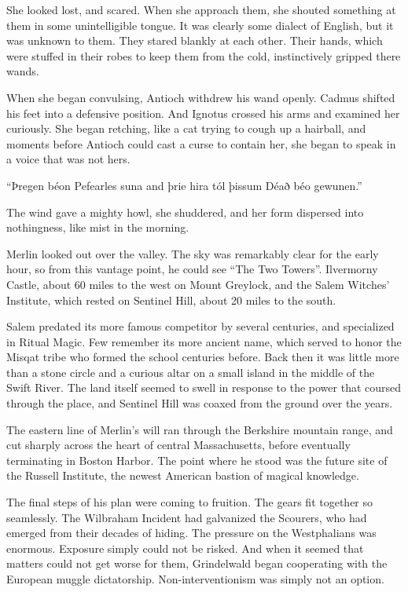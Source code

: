 She looked lost, and scared. When she approach them, she shouted something at them in some unintelligible tongue. It was clearly some dialect of English, but it was unknown to them. They stared blankly at each other. Their hands, which were stuffed in their robes to keep them from the cold, instinctively gripped there wands.

When she began convulsing, Antioch withdrew his wand openly. Cadmus shifted his feet into a defensive position. And Ignotus crossed his arms and examined her curiously. She began retching, like a cat trying to cough up a hairball, and moments before Antioch could cast a curse to contain her, she began to speak in a voice that was not hers.

“Þregen béon Pefearles suna and þrie hira tól þissum Déað béo gewunen.”

The wind gave a mighty howl, she shuddered, and her form dispersed into nothingness, like mist in the morning.

\simpleline


Merlin looked out over the valley. The sky was remarkably clear for the early hour, so from this vantage point, he could see “The Two Towers”. Ilvermorny Castle, about 60 miles to the west on Mount Greylock, and the Salem Witches’ Institute, which rested on Sentinel Hill, about 20 miles to the south.

Salem predated its more famous competitor by several centuries, and specialized in Ritual Magic. Few remember its more ancient name, which served to honor the Misqat tribe who formed the school centuries before. Back then it was little more than a stone circle and a curious altar on a small island in the middle of the Swift River. The land itself seemed to swell in response to the power that coursed through the place, and Sentinel Hill was coaxed from the ground over the years.

The eastern line of Merlin’s will ran through the Berkshire mountain range, and cut sharply across the heart of central Massachusetts, before eventually terminating in Boston Harbor. The point where he stood was the future site of the Russell Institute, the newest American bastion of magical knowledge.

The final steps of his plan were coming to fruition. The gears fit together so seamlessly. The Wilbraham Incident had galvanized the Scourers, who had emerged from their decades of hiding. The pressure on the Westphalians was enormous. Exposure simply could not be risked. And when it seemed that matters could not get worse for them, Grindelwald began cooperating with the European muggle dictatorship. Non-interventionism was simply not an option.

